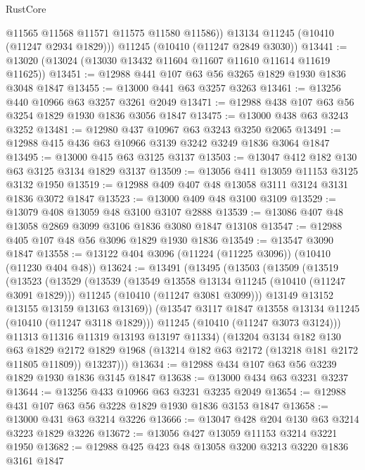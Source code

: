 \begin{lexlean}{RustCore}
\begin{coremodule}
          @11565
          @11568
          @11571
          @11575
          @11580
          @11586))
      @13134
      @11245
      (@10410 (@11247 @2934 @1829)))
    @11245
    (@10410 (@11247 @2849 @3030))
@13441 := @13020 (@13024 (@13030 @13432 @11604 @11607 @11610 @11614 @11619 @11625))
@13451 := @12988 @441 @107 @63 @56 @3265 @1829 @1930 @1836 @3048 @1847
@13455 := @13000 @441 @63 @3257 @3263
@13461 := @13256 @440 @10966 @63 @3257 @3261 @2049
@13471 := @12988 @438 @107 @63 @56 @3254 @1829 @1930 @1836 @3056 @1847
@13475 := @13000 @438 @63 @3243 @3252
@13481 := @12980 @437 @10967 @63 @3243 @3250 @2065
@13491 := @12988 @415 @436 @63 @10966 @3139 @3242 @3249 @1836 @3064 @1847
@13495 := @13000 @415 @63 @3125 @3137
@13503 := @13047 @412 @182 @130 @63 @3125 @3134 @1829 @3137
@13509 := @13056 @411 @13059 @11153 @3125 @3132 @1950
@13519 := @12988 @409 @407 @48 @13058 @3111 @3124 @3131 @1836 @3072 @1847
@13523 := @13000 @409 @48 @3100 @3109
@13529 := @13079 @408 @13059 @48 @3100 @3107 @2888
@13539 := @13086 @407 @48 @13058 @2869 @3099 @3106 @1836 @3080 @1847 @13108
@13547 := @12988 @405 @107 @48 @56 @3096 @1829 @1930 @1836
@13549 := @13547 @3090 @1847
@13558 := @13122 @404 @3096 (@11224 (@11225 @3096)) (@10410 (@11230 @404 @48))
@13624 := @13491
    (@13495
      (@13503
        (@13509
          (@13519
            (@13523
              (@13529
                (@13539
                  (@13549 @13558 @13134 @11245 (@10410 (@11247 @3091 @1829)))
                  @11245
                  (@10410 (@11247 @3081 @3099)))
                @13149
                @13152
                @13155
                @13159
                @13163
                @13169))
            (@13547 @3117 @1847 @13558 @13134 @11245 (@10410 (@11247 @3118 @1829)))
            @11245
            (@10410 (@11247 @3073 @3124)))
          @11313
          @11316
          @11319
          @13193
          @13197
          @11334)
        (@13204
          @3134
          @182
          @130
          @63
          @1829
          @2172
          @1829
          @1968
          (@13214 @182 @63 @2172 (@13218 @181 @2172 @11805 @11809))
          @13237)))
@13634 := @12988 @434 @107 @63 @56 @3239 @1829 @1930 @1836 @3145 @1847
@13638 := @13000 @434 @63 @3231 @3237
@13644 := @13256 @433 @10966 @63 @3231 @3235 @2049
@13654 := @12988 @431 @107 @63 @56 @3228 @1829 @1930 @1836 @3153 @1847
@13658 := @13000 @431 @63 @3214 @3226
@13666 := @13047 @428 @204 @130 @63 @3214 @3223 @1829 @3226
@13672 := @13056 @427 @13059 @11153 @3214 @3221 @1950
@13682 := @12988 @425 @423 @48 @13058 @3200 @3213 @3220 @1836 @3161 @1847

\end{coremodule}
\end{lexlean}
